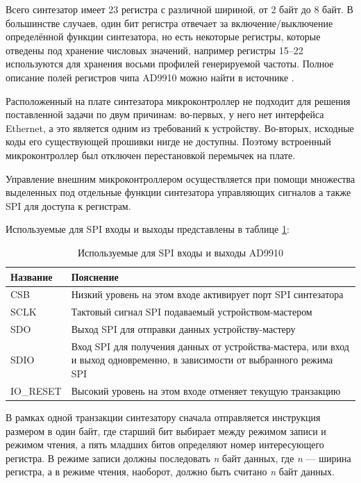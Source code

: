 \documentclass[rusmathsym, eqnumwithinsec, amspack, hyperref]{bomgost}
\begin{document}
Всего синтезатор имеет 23 регистра с различной шириной, от 2 байт до 8 байт. В большинстве случаев, один бит регистра отвечает за включение/выключение определённой функции синтезатора, но есть некоторые регистры, которые отведены под хранение числовых значений, например регистры 15--22 используются для хранения восьми профилей генерируемой частоты. Полное описание полей регистров чипа AD9910 можно найти в источнике \cite{AD9910Datasheet}.

Расположенный на плате синтезатора микроконтроллер не подходит для решения поставленной задачи по двум причинам: во-первых, у него нет интерфейса Ethernet, а это является одним из требований к устройству. Во-вторых, исходные коды его существующей прошивки нигде не доступны. Поэтому встроенный микроконтроллер был отключен перестановкой перемычек на плате.

Управление внешним микроконтроллером осуществляется при помощи множества выделенных под отдельные функции синтезатора управляющих сигналов а также SPI для доступа к регистрам.

Используемые для SPI входы и выходы представлены в таблице \ref{tab:spi_pins}:

\begin{table}[H]
\centering
\caption{Используемые для SPI входы и выходы AD9910}
\label{tab:spi_pins}
\begin{tabular}{|p{4cm}|p{8cm}|}
\hline 
\textbf{Название} & \textbf{Пояснение} \\ 
\hline 
CSB & Низкий уровень на этом входе активирует порт SPI синтезатора \\ 
\hline
SCLK & Тактовый сигнал SPI подаваемый устройством-мастером \\
\hline
SDO & Выход SPI для отправки данных устройству-мастеру \\
\hline
SDIO & Вход SPI для получения данных от устройства-мастера, или вход и выход одновременно, в зависимости от выбранного режима SPI \\
\hline 
IO\_RESET & Высокий уровень на этом входе отменяет текущую транзакцию \\
\hline
\end{tabular} 
\end{table}

В рамках одной транзакции синтезатору сначала отправляется инструкция размером в один байт, где старший бит выбирает между режимом записи и режимом чтения, а пять младших битов определяют номер интересующего регистра. В режиме записи должны последовать {\em n} байт данных, где {\em n} --- ширина регистра, а в режиме чтения, наоборот, должно быть считано {\em n} байт данных.
\end{document}
